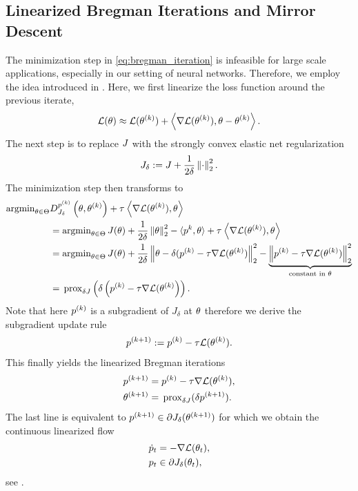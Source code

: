 \subsection{Linearized Bregman Iterations and Mirror Descent}
%
The minimization step in \cref{eq:bregman_iteration} is infeasible for large scale applications, especially in our setting of neural networks. Therefore, we employ the idea introduced in \cite{yin2008bregman, cai2009convergence}. Here, we first linearize the loss function around the previous iterate,
%
\begin{align*}
	\mathcal{L}(\theta) \approx \mathcal{L}(\theta^{(k)}) + 
	\left\langle \nabla\mathcal{L}(\theta^{(k)}), \theta - \theta^{(k)}
	\right\rangle.
\end{align*} 
%
The next step is to replace $J$ with the strongly convex elastic net regularization%
\begin{align}\label{eq:elastic_net}
	J_\delta:= J + \frac{1}{2\delta}\left\|\cdot\right\|^2_2.
\end{align}
%
The minimization step then transforms to
%
\begin{align}\label{eq:LinBregDer}
	\argmin_{\param\in\Param} &D^{\sg^{(k)}}_{\func_\delta} \left(\param,\param^{(k)}\right) + \tau^{}\left\langle \nabla\empLoss(\param^{(k)}), \param
	\right\rangle\\&= 
	\argmin_{\param\in\Param}
	J(\param) + \frac{1}{2\delta} \norm{\param}^{2}_2 - 
	\langle \sg^{k}, \param\rangle +
	\tau^{}\left\langle \nabla\empLoss(\param^{(k)}), \param
	\right\rangle\nonumber\\
	&=
	\argmin_{\param\in\Param}
	J(\param) + \frac{1}{2\delta} \norm{\param - \delta(\sg^{(k)} -\tau \nabla\empLoss(\param^{(k)})}^2_2 - \underbrace{\norm{\sg^{(k)} -\tau \nabla\empLoss(\param^{(k)})}^2_2}_{\text{constant in } \param}\nonumber\\
	&=
	\prox{\delta \func}\left(\delta\left(\sg^{(k)} -\tau \nabla\empLoss(\param^{(k)}\right)\right).\nonumber%
\end{align}
%
Note that here $p^{(k)}$ is a subgradient of $J_\delta$ at $\theta$ therefore we derive the subgradient update rule
%
\begin{align*}
	p^{(k+1)} := p^{(k)} - \tau \mathcal{L}(\theta^{(k)}).
\end{align*}
%
This finally yields the linearized Bregman iterations
%
\begin{subequations}\label{eq:lin_bregman_iteration}
	\begin{align}
		p^{(k+1)} &= p^{(k)} - \tau \nabla\mathcal{L}(\theta^{(k)}),\\
		\theta^{(k+1)} &= \,\mathrm{prox}_{\delta J}(\delta p^{(k+1)}).
	\end{align}
\end{subequations}
%
%
The last line is equivalent to $p^{(k+1)}\in\partial J_\delta(\theta^{(k+1)})$ for which we obtain the continuous linearized flow
%
\begin{align*}
	\dot{p}_t &= -\nabla \mathcal{L}(\theta_t),\\
	p_t &\in \partial J_\delta(\theta_t),
\end{align*}
%
see \cite{burger2006nonlinear,burger2007inverse}.
%
%
